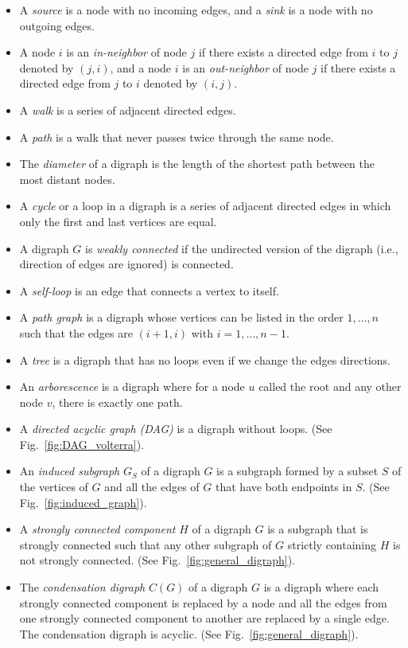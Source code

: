 \documentclass[letterpaper,10pt,journal]{IEEEtran}
\begin{document}
\begin{itemize}
    \item A \emph{source} is a node with no incoming edges, and a \emph{sink} is a node with no outgoing edges.
    \item A node $i$ is an \emph{in-neighbor} of node $j$ if there exists a directed edge from $i$ to $j$ denoted by $(j,i)$, and a node $i$ is an \emph{out-neighbor} of node $j$ if there exists a directed edge from $j$ to $i$ denoted by $(i,j)$.
    \item A \emph{walk} is a series of adjacent directed edges. 
    \item A \emph{path} is a walk that never passes twice through the same node.
    \item The \emph{diameter} of a digraph is the length of the shortest path between the most distant nodes.
    \item A \emph{cycle} or a loop in a digraph is a series of adjacent directed edges in which only the first and last vertices are equal.
    \item A digraph $G$ is \emph{weakly connected} if the undirected version of the digraph (i.e., direction of edges are ignored) is connected.
    \item A \emph{self-loop} is an edge that connects a vertex to itself.
    \item A \emph{path graph} is a digraph whose vertices can be listed in the order $1,\ldots,n$ such that the edges are $(i+1,i)$ with $i=1,\ldots,n-1$.
    \item A \emph{tree} is a digraph that has no loops even if we change the edges directions.
    \item An \emph{arborescence} is a digraph where for a node $u$ called the root and any other node $v$, there is exactly one path.
    \item A \emph{directed acyclic graph (DAG)} is a digraph without loops. (See Fig.~\ref{fig:DAG_volterra}).
    \item An \emph{induced subgraph} $G_S$ of a digraph $G$ is a subgraph formed by a subset $S$ of the vertices of $G$ and all the edges of $G$ that have both endpoints in $S$. (See Fig.~\ref{fig:induced_graph}). 
    \item A \emph{strongly connected component} $H$ of a digraph $G$ is a subgraph that is strongly connected such that any other subgraph of $G$ strictly containing $H$ is not strongly connected. (See Fig.~\ref{fig:general_digraph}).
    \item The \emph{condensation digraph} $C(G)$ of a digraph $G$ is a digraph where each strongly connected component is replaced by a node and all the edges from one strongly connected component to another are replaced by a single edge. The condensation digraph is acyclic. (See Fig.~\ref{fig:general_digraph}).

\end{itemize}
\end{document}
